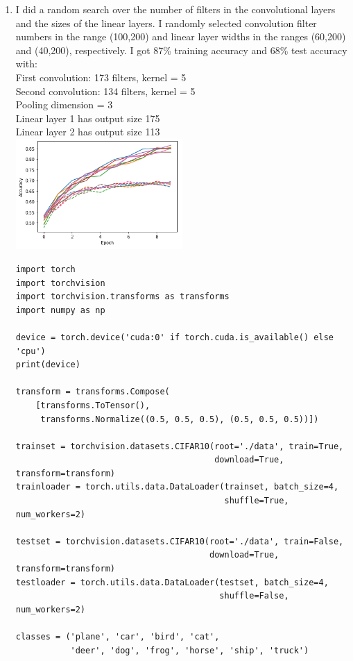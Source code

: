 \documentclass{article}
\begin{document}
\begin{enumerate}
        \newpage
        \item I did a random search over the number of filters in the convolutional layers and the sizes of the linear layers.
        I randomly selected convolution filter numbers in the range (100,200) and linear layer widths in the ranges (60,200) and (40,200), respectively.
        I got 87\% training accuracy and 68\% test accuracy with: \\
        First convolution: 173 filters, kernel = 5 \\
        Second convolution: 134 filters, kernel = 5 \\
        Pooling dimension = 3 \\
        Linear layer 1 has output size 175 \\
        Linear layer 2 has output size 113 \\
        \includegraphics[width=0.5\textwidth]{code/A4d.png}
        \begin{verbatim}
import torch
import torchvision
import torchvision.transforms as transforms
import numpy as np

device = torch.device('cuda:0' if torch.cuda.is_available() else 'cpu')
print(device)

transform = transforms.Compose(
    [transforms.ToTensor(),
     transforms.Normalize((0.5, 0.5, 0.5), (0.5, 0.5, 0.5))])

trainset = torchvision.datasets.CIFAR10(root='./data', train=True,
                                        download=True, transform=transform)
trainloader = torch.utils.data.DataLoader(trainset, batch_size=4,
                                          shuffle=True, num_workers=2)

testset = torchvision.datasets.CIFAR10(root='./data', train=False,
                                       download=True, transform=transform)
testloader = torch.utils.data.DataLoader(testset, batch_size=4,
                                         shuffle=False, num_workers=2)

classes = ('plane', 'car', 'bird', 'cat',
           'deer', 'dog', 'frog', 'horse', 'ship', 'truck')


\end{verbatim}
\end{enumerate}
\end{document}
